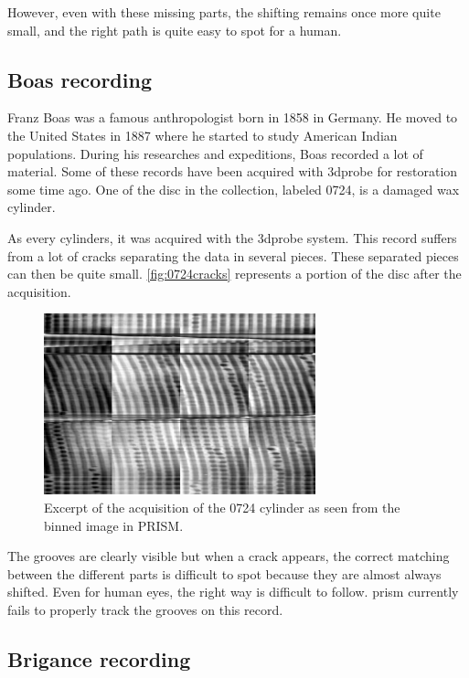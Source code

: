 However, even with these missing parts, the shifting remains once more quite small, and the right path is quite easy to spot for a human.

\subsection{Boas recording}

Franz Boas was a famous anthropologist born in 1858 in Germany. He moved to the United States in 1887 where he started to study American Indian populations. During his researches and expeditions, Boas recorded a lot of material. Some of these records have been acquired with \gls{3dprobe} for restoration some time ago. One of the disc in the collection, labeled 0724, is a damaged wax cylinder.

As every cylinders, it was acquired with the \gls{3dprobe} system. This record suffers from a lot of cracks separating the data in several pieces. These separated pieces can then be quite small. \autoref{fig:0724cracks} represents a portion of the disc after the acquisition.

\begin{figure}[!ht]
\centering
\includegraphics[width=0.7\textwidth]{images/0724-cracks}
\caption{Excerpt of the acquisition of the 0724 cylinder as seen from the binned image in PRISM.}
\label{fig:0724cracks}
\end{figure}

The grooves are clearly visible but when a crack appears, the correct matching between the different parts is difficult to spot because they are almost always shifted. Even for human eyes, the right way is difficult to follow. \gls{prism} currently fails to properly track the grooves on this record.

\subsection{Brigance recording}


